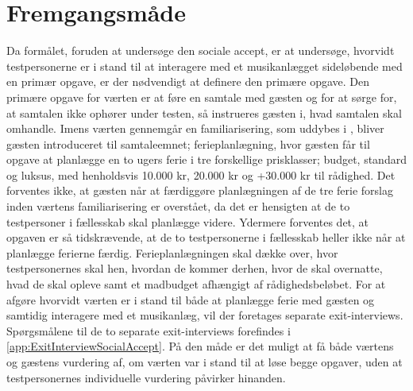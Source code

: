 \section{Fremgangsmåde}
\label{FremgangsmaadeSocialAccept}
%
Da formålet, foruden at undersøge den sociale accept, er at undersøge, hvorvidt testpersonerne er i stand til at interagere med et musikanlægget sideløbende med en primær opgave, er der nødvendigt at definere den primære opgave. Den primære opgave for værten er at føre en samtale med gæsten og for at sørge for, at samtalen ikke ophører under testen, så instrueres gæsten i, hvad samtalen skal omhandle. Imens værten gennemgår en familiarisering, som uddybes i , bliver gæsten introduceret til samtaleemnet; ferieplanlægning, hvor gæsten får til opgave at planlægge en to ugers ferie i tre forskellige prisklasser; budget, standard og luksus, med henholdsvis 10.000 kr, 20.000 kr og +30.000 kr til rådighed. Det forventes ikke, at gæsten når at færdiggøre planlægningen af de tre ferie forslag inden værtens familiarisering er overstået, da det er hensigten at de to testpersoner i fællesskab skal planlægge videre. Ydermere forventes det, at opgaven er så tidskrævende, at de to testpersonerne i fællesskab heller ikke når at planlægge ferierne færdig. Ferieplanlægningen skal dække over, hvor testpersonernes skal hen, hvordan de kommer derhen, hvor de skal overnatte, hvad de skal opleve samt et madbudget afhængigt af rådighedsbeløbet. For at afgøre hvorvidt værten er i stand til både at planlægge ferie med gæsten og samtidig interagere med et musikanlæg, vil der foretages separate exit-interviews. Spørgsmålene til de to separate exit-interviews forefindes i \autoref{app:ExitInterviewSocialAccept}. På den måde er det muligt at få både værtens og gæstens vurdering af, om værten var i stand til at løse begge opgaver, uden at testpersonernes individuelle vurdering påvirker hinanden. \blankline
%
